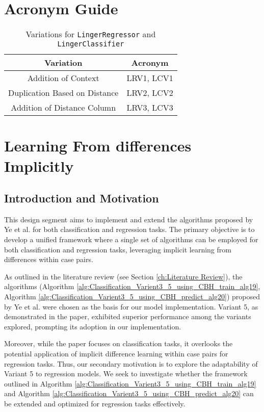 \documentclass[a4paper, 12pt]{report}
\begin{document}
\section{Acronym Guide}
\begin{table}[ht]
    \centering
    \caption{Variations for \texttt{LingerRegressor} and \texttt{LingerClassifier}}
    \begin{tabular}{ |c|c| }
        \hline
        \textbf{Variation} & \textbf{Acronym} \\
        \hline
        Addition of Context & LRV1, LCV1 \\
        Duplication Based on Distance & LRV2, LCV2 \\
        Addition of Distance Column & LRV3, LCV3 \\
        \hline
    \end{tabular}
    \label{table:linger_regressor_classifier_variations}
\end{table}

\section{Learning From differences Implicitly}

\subsection{Introduction and Motivation}
This design segment aims to implement and extend the algorithms proposed by Ye et al. \cite{ye2021learning} for both classification and regression tasks. 
The primary objective is to develop a unified framework where a single set of algorithms can be employed for 
both classification and regression tasks, leveraging implicit learning from differences within case pairs.

As outlined in the literature review (see Section \ref{ch:Literature Review}), the algorithms (Algorithm \ref{alg:Classification_Varient3_5_using_CBH_train_alg19}, 
Algorithm \ref{alg:Classification_Varient3_5_using_CBH_predict_alg20}) proposed by Ye et al. were chosen as the basis for our model implementation. Variant 5, 
as demonstrated in the paper, exhibited superior performance among the variants explored, prompting its adoption in our implementation.

Moreover, while the paper focuses on classification tasks, it overlooks the potential application of implicit difference learning within case pairs for regression tasks. 
Thus, our secondary motivation is to explore the adaptability of Variant 5 to regression models. We seek to investigate whether the framework outlined in Algorithm \ref{alg:Classification_Varient3_5_using_CBH_train_alg19} and 
Algorithm \ref{alg:Classification_Varient3_5_using_CBH_predict_alg20} can be extended and optimized for regression tasks effectively.
\end{document}
